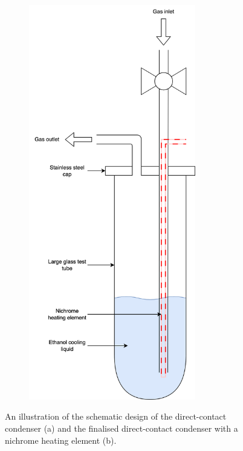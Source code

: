 \begin{figure}
    \hfill
    \begin{subfigure}[b]{0.475\textwidth}  
        \centering 
        \includegraphics[width=0.8\textwidth]{chapter_6/figures/condenser_design_2.png}
        \caption{}
        \label{fig:condenser_design_2}
    \end{subfigure}

    \caption{\small An illustration of the schematic design of the direct-contact condenser (a) and the finalised direct-contact condenser with a nichrome heating element (b).} 
    \label{fig:condenser_design_both}
\end{figure}

